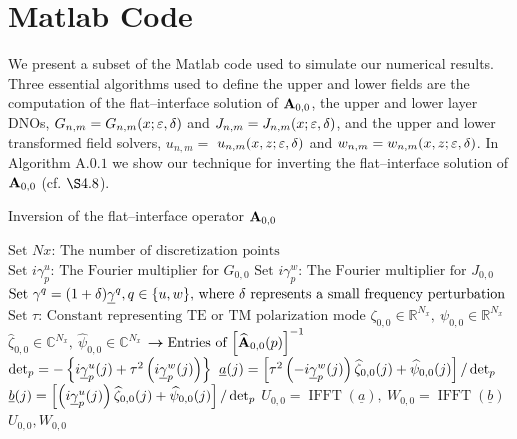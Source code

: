 \newpage
{}
\appendices
\appendix

\chapter{Matlab Code}
\label{Appendix A: Matlab Code}
\thispagestyle{pageonbottom}

\pagestyle{fancy}
\renewcommand{\sectionmark}[1]{\markright{#1}}
\fancyhead{}
\fancyhead[LE,RO]{\thepage}
\fancyfoot[L,R,C]{}
\renewcommand{\headrulewidth}{1pt}%
We present a subset of the Matlab code used to simulate our numerical results. Three essential algorithms used to define the upper and lower fields are the computation of the flat--interface solution of $\mathbf{A}_{0,0}$, the upper and lower layer DNOs, $G_{n,m}=G_{n,m}(x;\varepsilon,\delta)$ and $J_{n,m}=J_{n,m}(x;\varepsilon,\delta)$, and the upper and lower transformed field solvers, $u_{n,m}=$ $u_{n,m}(x,z;\varepsilon,\delta)$ and $w_{n,m}=w_{n,m}(x,z;\varepsilon,\delta)$. In Algorithm $\text{A}.0.1$ we show our technique for inverting the flat--interface solution of $\mathbf{A}_{0,0}$ (cf. $\S 4.8$).
\vspace{-15mm}
\begin{algorithm}[H]
\caption{Inversion of the flat--interface operator $\mathbf{A}_{0,0}$}
\label{alg:inverse_ao}
\begin{algorithmic}[1]
\State $\text{Set $Nx$: The number of discretization points}$
\State $\text{Set $i\gamma_p^u$: The Fourier multiplier for $G_{0,0}$}$
\State $\text{Set $i\gamma_p^w$: The Fourier multiplier for $J_{0,0}$}$
\State $\text{Set $\gamma^q=(1+\delta)\underline{\gamma}^q,q\in\{u,w\},$ where $\delta$ represents a small frequency perturbation}$
\State $\text{Set $\tau$: Constant representing TE or TM polarization mode}$
\State $\zeta_{0,0} \in\mathbb R^{N_x},~\psi_{0,0} \in\mathbb R^{N_x} $
\vspace{0.5mm}
\State $\widehat{\zeta}_{0,0} \in\mathbb C^{N_x},~\widehat{\psi}_{0,0} \in\mathbb C^{N_x} $
 \do ${\boldsymbol{\rightarrow} \text{Entries of $\left[ \widehat{\mathbf{A}}_{0,0}(p) \right]^{-1} $}}$
\State $\operatorname{det}_p = -\left\{i\underline{\gamma}_p^u(j) + \tau^2\left( i\underline{\gamma}_p^w(j)\right)\right\}$
\State $\underline{a}(j) = \left[\tau^2\left( -i\underline{\gamma}_p^w(j)\right)\widehat{\zeta}_{0,0}(j) + \widehat{\psi}_{0,0}(j)\right]/\operatorname{det}_p $
\State $\underline{b}(j) = \left[\left(i\underline{\gamma}_p^u(j)\right)\widehat{\zeta}_{0,0}(j) + \widehat{\psi}_{0,0}(j)\right]/\operatorname{det}_p $
\EndFor
\State $U_{0,0}=\operatorname{IFFT}(\underline{a}), ~ W_{0,0}=\operatorname{IFFT}(\underline{b})$
\State\Return $U_{0,0}, W_{0,0}$
\end{algorithmic}
\end{algorithm}
